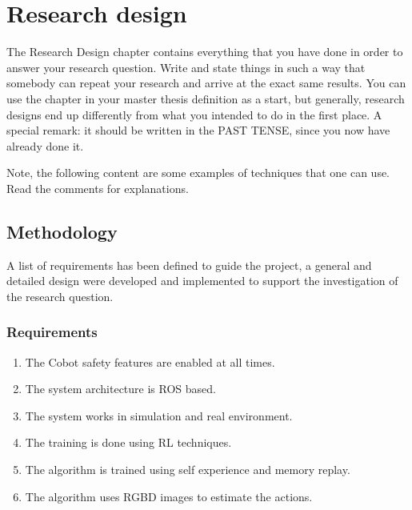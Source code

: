 \chapter{Research design}\label{chap:research}

The Research Design chapter contains everything that you have done in order to answer your research question. Write and state things in such a way that somebody can repeat your research and arrive at the exact same results. You can use the chapter in your master thesis definition as a start, but generally, research designs end up differently from what you intended to do in the first place. A special remark: it should be written in the PAST TENSE, since you now have already done it.


Note, the following content are some examples of techniques that one can use. Read the comments for explanations.


\section{Methodology}

A list of requirements has been defined to guide the project, a general and detailed design were developed and implemented to support the investigation of the research question.

\subsection{Requirements}

\vspace{2mm}
\begin{enumerate}
  \item The Cobot safety features are enabled at all times.
  \item The system architecture is ROS based.
  \item The system works in simulation and real environment.
  \item The training is done using RL techniques.
  \item The algorithm is trained using self experience and memory replay.
  \item The algorithm uses RGBD images to estimate the actions.
\end{enumerate}
\vspace{3mm}

